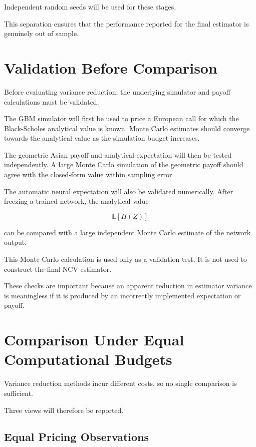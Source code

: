 \documentclass[12pt,a4paper]{report}
\begin{document}
Independent random seeds will be used for these stages.

This separation ensures that the performance reported for the final estimator is genuinely out of sample.

\section{Validation Before Comparison}

Before evaluating variance reduction, the underlying simulator and payoff calculations must be validated.

The GBM simulator will first be used to price a European call for which the Black-Scholes analytical value is known. Monte Carlo estimates should converge towards the analytical value as the simulation budget increases.

The geometric Asian payoff and analytical expectation will then be tested independently. A large Monte Carlo simulation of the geometric payoff should agree with the closed-form value within sampling error.

The automatic neural expectation will also be validated numerically. After freezing a trained network, the analytical value

\begin{equation}
\mathbb{E}[H(Z)]
\end{equation}

can be compared with a large independent Monte Carlo estimate of the network output.

This Monte Carlo calculation is used only as a validation test. It is not used to construct the final NCV estimator.

These checks are important because an apparent reduction in estimator variance is meaningless if it is produced by an incorrectly implemented expectation or payoff.

\section{Comparison Under Equal Computational Budgets}

Variance reduction methods incur different costs, so no single comparison is sufficient.

Three views will therefore be reported.

\subsection{Equal Pricing Observations}
\end{document}
